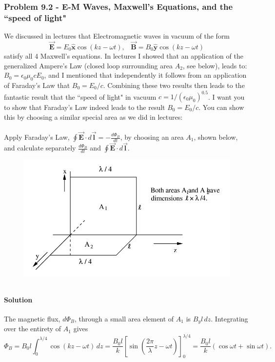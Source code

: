 \documentclass{article}
\begin{document}
\subsubsection*{Problem 9.2 - E-M Waves, Maxwell's Equations, and the “speed of light"}
We discussed in lectures that Electromagnetic waves in vacuum of the form
\[\boldsymbol{\vec{E}}=E_0\boldsymbol{\hat{x}}\cos(kz-\omega t),\,\,\,\,\,\boldsymbol{\vec{B}}=B_0\boldsymbol{\hat{y}}\cos(kz-\omega t)\]
satisfy all 4 Maxwell's equations. In lectures I showed that an application of the generalized Ampere's Law (closed loop surrounding area $A_2$, see below), leads to: $B_0=\epsilon_0\mu_0cE_0$, and I mentioned that independently it follows from an application of Faraday's Law that $B_0=E_0/c$. Combining these two results then leads to the fantastic result that the “speed of light" in vacuum $c=1/\left(\epsilon_0\mu_0\right)^{0.5}$. I want you to show that Faraday's Law indeed leads to the result $B_0=E_0/c$. You can show this by choosing a similar special area as we did in lectures:
\\
\\Apply Faraday's Law, $\oint\boldsymbol{\vec{E}}\cdot d\boldsymbol{\vec{l}}=-\frac{d\Phi_B}{dt}$, by choosing an area $A_1$, shown below, and calculate separately $\frac{d\Phi_B}{dt}$ and $\oint\boldsymbol{\vec{E}}\cdot d\boldsymbol{\vec{l}}$.
\begin{figure}[h]
    \centering
    \includegraphics[width=0.7\linewidth]{figs/fig_prob_9.2.png}
\end{figure}
\\\textbf{Solution}
\\
\\The magnetic flux, $d\Phi_B$, through a small area element of $A_1$ is $B_yl\,dz$. Integrating over the entirety of $A_1$ gives
\[\Phi_B=B_0l\int_{0}^{\lambda/4}\cos(kz-\omega t)\,dz=\frac{B_0l}{k}\left[\sin\left(\frac{2\pi}{\lambda}z-\omega t\right)\right]_{0}^{\lambda/4}=\frac{B_0l}{k}(\cos\omega t+\sin\omega t).\]
\end{document}
